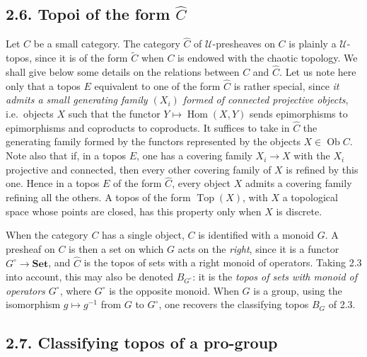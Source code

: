 \documentclass[11pt]{article}
\newcommand{\U}{\mathcal{U}}
\newcommand{\Set}{\mathbf{Set}}
\newcommand{\Top}{\operatorname{Top}}
\newcommand{\Hom}{\operatorname{Hom}}
\newcommand{\Ob}{\operatorname{Ob}}
\newcommand{\ie}{i.e.}
\begin{document}
\subsection*{2.6. Topoi of the form \(\widehat C\)}
Let \(C\) be a small category. The category \(\widehat C\) of \(\U\)-presheaves on \(C\) is plainly a \(\U\)-topos, since it is of the form \(\widetilde C\) when \(C\) is endowed with the chaotic topology. We shall give below some details on the relations between \(C\) and \(\widehat C\). Let us note here only that a topos \(E\) equivalent to one of the form \(\widehat C\) is rather special, since \emph{it admits a small generating family \((X_i)\) formed of connected projective objects}, \ie\ objects \(X\) such that the functor \(Y\mapsto\Hom(X,Y)\) sends epimorphisms to epimorphisms and coproducts to coproducts. It suffices to take in \(\widehat C\) the generating family formed by the functors represented by the objects \(X\in\Ob C\). Note also that if, in a topos \(E\), one has a covering family \(X_i\to X\) with the \(X_i\) projective and connected, then every other covering family of \(X\) is refined by this one. Hence in a topos \(E\) of the form \(\widehat C\), every object \(X\) admits a covering family refining all the others. A topos of the form \(\Top(X)\), with \(X\) a topological space whose points are closed, has this property only when \(X\) is discrete.

When the category \(C\) has a single object, \(C\) is identified with a monoid \(G\). A presheaf on \(C\) is then a set on which \(G\) acts on the \emph{right}, since it is a functor \(G^\circ\to\Set\), and \(\widehat C\) is the topos of sets with a right monoid of operators. Taking 2.3 into account, this may also be denoted \(B_{G^\circ}\): it is the \emph{topos of sets with monoid of operators \(G^\circ\)}, where \(G^\circ\) is the opposite monoid. When \(G\) is a group, using the isomorphism \(g\mapsto g^{-1}\) from \(G\) to \(G^\circ\), one recovers the classifying topos \(B_G\) of 2.3.

\subsection*{2.7. Classifying topos of a pro-group}
\end{document}
